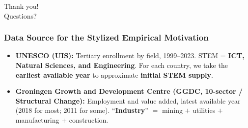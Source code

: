 \documentclass[9pt,xcolor={svgnames}]{beamer}
\begin{document}
\begin{frame}
  \centering
  \huge Thank you! \\
  \vspace{1em}
  \normalsize Questions?
\end{frame}






















\begin{frame}\label{app:datasource}
\frametitle{Data Source for the Stylized Empirical Motivation}
\begin{itemize}

\item \textbf{UNESCO (UIS):} Tertiary enrollment by field, 1999–2023. 
STEM = \textbf{ICT, Natural Sciences, and Engineering}.  
For each country, we take the \textbf{earliest available year} to approximate \textbf{initial STEM supply}.

\medskip

\item \textbf{Groningen Growth and Development Centre (GGDC, 10-sector / Structural Change):} 
Employment and value added, latest available year (2018 for most; 2011 for some).  
“\textbf{Industry}” $=$ mining $+$ utilities $+$ manufacturing $+$ construction.

\end{itemize}

\hyperlink{main:scatterplot}{}

\end{frame}
\end{document}
